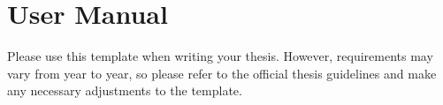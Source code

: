 \chapter{User Manual\label{chap:user-manual}}
Please use this template when writing your thesis. However, requirements may vary from year to year, so please refer to the official thesis guidelines and make any necessary adjustments to the template.